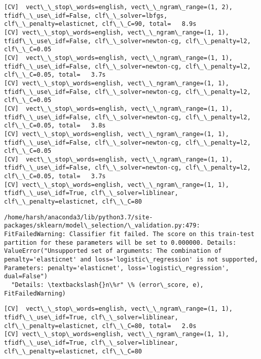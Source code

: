 \documentclass[11pt]{article}
\begin{document}
    \begin{Verbatim}[commandchars=\\\{\}]
[CV]  vect\_\_stop\_words=english, vect\_\_ngram\_range=(1, 2), tfidf\_\_use\_idf=False, clf\_\_solver=lbfgs, clf\_\_penalty=elasticnet, clf\_\_C=90, total=   8.9s
[CV] vect\_\_stop\_words=english, vect\_\_ngram\_range=(1, 1), tfidf\_\_use\_idf=False, clf\_\_solver=newton-cg, clf\_\_penalty=l2, clf\_\_C=0.05 
[CV]  vect\_\_stop\_words=english, vect\_\_ngram\_range=(1, 1), tfidf\_\_use\_idf=False, clf\_\_solver=newton-cg, clf\_\_penalty=l2, clf\_\_C=0.05, total=   3.7s
[CV] vect\_\_stop\_words=english, vect\_\_ngram\_range=(1, 1), tfidf\_\_use\_idf=False, clf\_\_solver=newton-cg, clf\_\_penalty=l2, clf\_\_C=0.05 
[CV]  vect\_\_stop\_words=english, vect\_\_ngram\_range=(1, 1), tfidf\_\_use\_idf=False, clf\_\_solver=newton-cg, clf\_\_penalty=l2, clf\_\_C=0.05, total=   3.8s
[CV] vect\_\_stop\_words=english, vect\_\_ngram\_range=(1, 1), tfidf\_\_use\_idf=False, clf\_\_solver=newton-cg, clf\_\_penalty=l2, clf\_\_C=0.05 
[CV]  vect\_\_stop\_words=english, vect\_\_ngram\_range=(1, 1), tfidf\_\_use\_idf=False, clf\_\_solver=newton-cg, clf\_\_penalty=l2, clf\_\_C=0.05, total=   3.7s
[CV] vect\_\_stop\_words=english, vect\_\_ngram\_range=(1, 1), tfidf\_\_use\_idf=True, clf\_\_solver=liblinear, clf\_\_penalty=elasticnet, clf\_\_C=80 

    \end{Verbatim}

    \begin{Verbatim}[commandchars=\\\{\}]
/home/harsh/anaconda3/lib/python3.7/site-packages/sklearn/model\_selection/\_validation.py:479: FitFailedWarning: Classifier fit failed. The score on this train-test partition for these parameters will be set to 0.000000. Details: 
ValueError("Unsupported set of arguments: The combination of penalty='elasticnet' and loss='logistic\_regression' is not supported, Parameters: penalty='elasticnet', loss='logistic\_regression', dual=False")
  "Details: \textbackslash{}n\%r" \% (error\_score, e), FitFailedWarning)

    \end{Verbatim}

    \begin{Verbatim}[commandchars=\\\{\}]
[CV]  vect\_\_stop\_words=english, vect\_\_ngram\_range=(1, 1), tfidf\_\_use\_idf=True, clf\_\_solver=liblinear, clf\_\_penalty=elasticnet, clf\_\_C=80, total=   2.0s
[CV] vect\_\_stop\_words=english, vect\_\_ngram\_range=(1, 1), tfidf\_\_use\_idf=True, clf\_\_solver=liblinear, clf\_\_penalty=elasticnet, clf\_\_C=80 

    \end{Verbatim}
\end{document}

